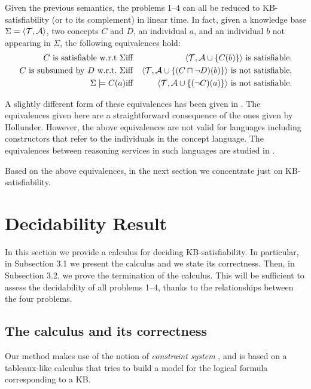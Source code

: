 Given the previous semantics, the problems 1--4 can all be reduced to
KB-satisfiability (or to its complement) in linear time. 
In fact, given a knowledge base $\Sigma=\langle{\cal T},{\cal A}\rangle$, 
two concepts $C$ and $D$, an individual $a$, and an individual $b$ not appearing in $\Sigma$,
the following equivalences hold:
\begin{eqnarray*}
C {\rm ~is~ satisfiable~ w.r.t~} \Sigma &{\rm iff}& \langle {\cal T},{\cal A}\cup\{C(b)\} \rangle {\rm ~is~
satisfiable.}\\
C {\rm ~is ~subsumed ~by~} D~ {\rm w.r.t.~} \Sigma &{\rm iff}& 
\langle {\cal T},{\cal A}\cup\{(C \sqcap \neg D)(b)\} \rangle {\rm ~is~ not~ 
satisfiable.}\\
\Sigma \models C(a) &{\rm iff}& \langle {\cal T},{\cal A}\cup\{(\neg C)(a)\} \rangle 
{\rm ~is ~not ~satisfiable.} 
\end{eqnarray*}

A slightly different form of these equivalences has been given in
\cite{Holl90}.
The equivalences given here are a straightforward consequence of the ones given
by Hollunder. However, the above equivalences are not valid for
languages including constructors that refer to the individuals in the
concept language. The equivalences between reasoning services in such
languages are studied in \cite{Scha93c}.

Based on the above equivalences, in the next section 
we concentrate just on KB-satisfiability.

\section{Decidability Result}\label{sec-decidability}

In this section we provide a calculus for deciding KB-satisfiability.
In particular, in Subsection 3.1 we present the calculus and we state its correctness. 
Then, in Subsection 3.2,  we prove the termination of the calculus.
This will be sufficient to assess the decidability of all problems 1--4, 
thanks to the relationships between the four problems.

\subsection{The calculus and its correctness}

Our method makes use of the notion of {\em constraint
system} \cite{DLNN91,ScSm91,DLNS91}, and is based on a
tableaux-like calculus \cite{Fitt90} that tries to build a model for the
logical formula  corresponding to a KB. 

